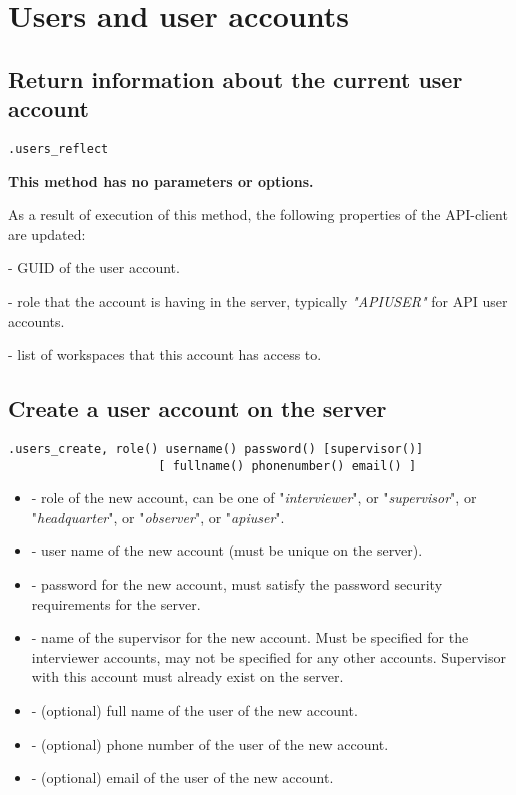 \section{Users and user accounts}

\subsection{Return information about the current user account}
\begin{lstlisting}[style=CommandLineStyle]
.users_reflect
\end{lstlisting}

\textbf{This method has no parameters or options.}

\savedres

As a result of execution of this method, the following properties of the API-client are updated:

\begin{compactitem}
    \item {} - GUID of the user account.
    \item {} - role that the account is having in the server, typically \textit{"APIUSER"} for API user accounts.
    \item {} - list of workspaces that this account has access to.
\end{compactitem}


\subsection{Create a user account on the server}
\begin{lstlisting}[style=CommandLineStyle]
.users_create, role() username() password() [supervisor()]
                     [ fullname() phonenumber() email() ]
\end{lstlisting}

\optsheader
\begin{itemize}
      \item {} - role of the new account, can be one of "\textit{interviewer}", or "\textit{supervisor}", or "\textit{headquarter}", or "\textit{observer}", or "\textit{apiuser}".
      \item {} - user name of the new account (must be unique on the server).
      \item {} - password for the new account, must satisfy the password security requirements for the server.
      \item {} - name of the supervisor for the new account. Must be specified for the interviewer accounts, may not be specified for any other accounts. Supervisor with this account must already exist on the server.
     \item {} - (optional) full name of the user of the new account.
     \item {} - (optional) phone number of the user of the new account.
     \item {} - (optional) email of the user of the new account.
\end{itemize}

